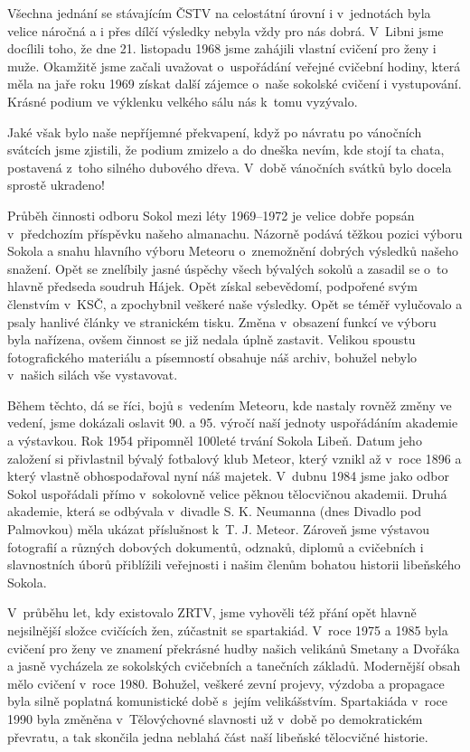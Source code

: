 \documentclass[a5paper, 12pt, twoside]{article}
\begin{document}
Všechna jednání se stávajícím ČSTV na celostátní úrovní i v~jednotách
byla velice náročná a i přes dílčí výsledky nebyla vždy pro nás dobrá.
V~Libni jsme docílili toho, že dne 21. listopadu 1968 jsme zahájili
vlastní cvičení pro ženy i muže. Okamžitě jsme začali uvažovat
o~uspořádání veřejné cvičební hodiny, která měla na jaře roku 1969 získat
další zájemce o~naše sokolské cvičení i vystupování. Krásné podium ve
výklenku velkého sálu nás k~tomu vyzývalo.

Jaké však bylo naše nepříjemné překvapení, když po návratu po vánočních
svátcích jsme zjistili, že podium zmizelo a do dneška nevím, kde stojí
ta chata, postavená z~toho silného dubového dřeva. V~době vánočních
svátků bylo docela sprostě ukradeno!

Průběh činnosti odboru Sokol mezi léty 1969--1972 je velice
dobře popsán v~předchozím příspěvku našeho almanachu. Názorně podává
těžkou pozici výboru Sokola a snahu hlavního výboru Meteoru o~znemožnění
dobrých výsledků našeho snažení. Opět se znelíbily jasné úspěchy všech
bývalých sokolů a zasadil se o~to hlavně předseda soudruh Hájek. Opět
získal sebevědomí, podpořené svým členstvím v~KSČ, a zpochybnil veškeré
naše výsledky. Opět se téměř vylučovalo a psaly hanlivé články ve
stranickém tisku. Změna v~obsazení funkcí ve výboru byla nařízena, ovšem
činnost se již nedala úplně zastavit. Velikou spoustu fotografického
materiálu a písemností obsahuje náš archiv, bohužel nebylo v~našich
silách vše vystavovat.

Během těchto, dá se říci, bojů s~vedením Meteoru, kde nastaly rovněž
změny ve vedení, jsme dokázali oslavit 90. a 95. výročí naší jednoty
uspořádáním akademie a výstavkou. Rok 1954 připomněl 100leté trvání
Sokola Libeň. Datum jeho založení si přivlastnil bývalý fotbalový klub
Meteor, který vznikl až v~roce 1896 a který vlastně obhospodařoval nyní
náš majetek. V~dubnu 1984 jsme jako odbor Sokol uspořádali přímo
v~sokolovně velice pěknou tělocvičnou akademii. Druhá akademie, která se
odbývala v~divadle S. K. Neumanna (dnes Divadlo pod Palmovkou) měla
ukázat příslušnost k~T. J. Meteor. Zároveň jsme výstavou fotografií a
různých dobových dokumentů, odznaků, diplomů a cvičebních i slavnostních
úborů přiblížili veřejnosti i našim členům bohatou historii libeňského
Sokola.

V~průběhu let, kdy existovalo ZRTV, jsme vyhověli též přání opět hlavně
nejsilnější složce cvičících žen, zúčastnit se spartakiád. V~roce 1975 a
1985 byla cvičení pro ženy ve znamení překrásné hudby našich velikánů
Smetany a Dvořáka a jasně vycházela ze sokolských cvičebních a tanečních
základů. Modernější obsah mělo cvičení v~roce 1980. Bohužel, veškeré
zevní projevy, výzdoba a propagace byla silně poplatná komunistické době
s~jejím velikášstvím. Spartakiáda v~roce 1990 byla změněna
v~Tělovýchovné slavnosti už v~době po demokratickém převratu, a tak
skončila jedna neblahá část naší libeňské tělocvičné historie.
\end{document}
